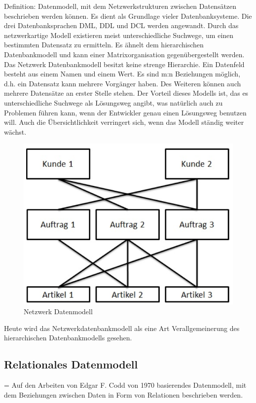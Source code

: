 Definition: Datenmodell, mit dem Netzwerkstrukturen zwischen Datensätzen beschrieben werden können.
Es dient als Grundlage vieler Datenbanksysteme. Die drei Datenbanksprachen DML, DDL und DCL werden angewandt. Durch das netzwerkartige Modell existieren meist unterschiedliche Suchwege, um einen bestimmten Datensatz zu ermitteln. Es ähnelt dem hierarchischen Datenbankmodell und kann einer Matrixorganisation gegenübergestellt werden. 
Das Netzwerk Datenbankmodell besitzt keine strenge Hierarchie. Ein Datenfeld besteht aus einem Namen und einem Wert.
Es sind m:n Beziehungen möglich, d.h. ein Datensatz kann mehrere Vorgänger haben. Des Weiteren können auch mehrere Datensätze an erster Stelle stehen. Der Vorteil dieses Modells ist, das es unterschiedliche Suchwege als Lösungsweg angibt, was natürlich auch zu Problemen führen kann, wenn der Entwickler genau einen Lösungsweg benutzen will. Auch die Übersichtlichkeit verringert sich, wenn das Modell ständig weiter wächst.

\begin{figure}[h]
    \centering
    \includegraphics[width=.75\textwidth]{Content/images/modellierung/netzwerk.png}
    \caption{Netzwerk Datenmodell}
    \label{fig:modellierung:netzwerk}
 \end{figure}

 Heute wird das Netzwerkdatenbankmodell als eine Art Verallgemeinerung des hierarchischen Datenbankmodells gesehen.

 \subsection{Relationales Datenmodell}

 = Auf den Arbeiten von Edgar F. Codd von 1970 basierendes Datenmodell, mit dem Beziehungen zwischen Daten in Form von Relationen beschrieben werden. 

